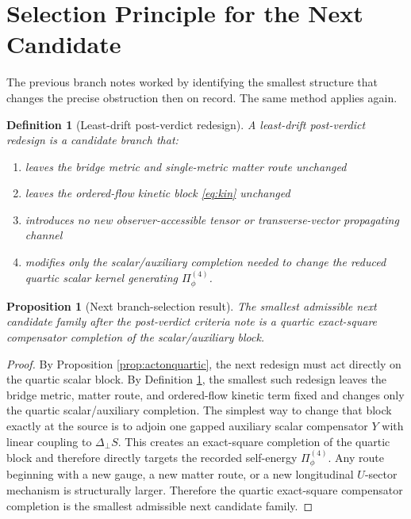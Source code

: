 \documentclass[11pt]{article}
\newtheorem{definition}{Definition}
\newtheorem{proposition}{Proposition}
\begin{document}
\section{Selection Principle for the Next Candidate}

The previous branch notes worked by identifying the smallest structure that changes the precise obstruction then on record. The same method applies again.

\begin{definition}[Least-drift post-verdict redesign]
\label{def:leastdrift}
A \emph{least-drift post-verdict redesign} is a candidate branch that:
\begin{enumerate}
    \item leaves the bridge metric and single-metric matter route unchanged
    \item leaves the ordered-flow kinetic block \eqref{eq:kin} unchanged
    \item introduces no new observer-accessible tensor or transverse-vector propagating channel
    \item modifies only the scalar/auxiliary completion needed to change the reduced quartic scalar kernel generating \(\Pi_\phi^{(4)}\).
\end{enumerate}
\end{definition}

\begin{proposition}[Next branch-selection result]
\label{prop:select}
The smallest admissible next candidate family after the post-verdict criteria note is a quartic exact-square compensator completion of the scalar/auxiliary block.
\end{proposition}

\begin{proof}
By Proposition \ref{prop:actonquartic}, the next redesign must act directly on the quartic scalar block. By Definition \ref{def:leastdrift}, the smallest such redesign leaves the bridge metric, matter route, and ordered-flow kinetic term fixed and changes only the quartic scalar/auxiliary completion. The simplest way to change that block exactly at the source is to adjoin one gapped auxiliary scalar compensator \(Y\) with linear coupling to \(\Delta_\perp S\). This creates an exact-square completion of the quartic block and therefore directly targets the recorded self-energy \(\Pi_\phi^{(4)}\). Any route beginning with a new gauge, a new matter route, or a new longitudinal \(U\)-sector mechanism is structurally larger. Therefore the quartic exact-square compensator completion is the smallest admissible next candidate family.
\end{proof}
\end{document}
